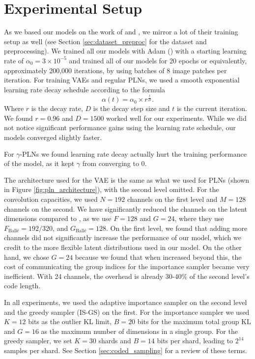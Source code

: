 \section{Experimental Setup}
\par
As we based our models on the work of \cite{balle2016end} and
\cite{balle2018variational}, we mirror a lot of their training setup as well
(see Section \ref{sec:dataset_preproc} for the dataset and preprocessing). We
trained all our models with Adam (\cite{kingma2014adam}) with a starting
learning rate of $\alpha_0 =
3 \times 10^{-5}$ and trained all of our models for 20 epochs or equivalently,
approximately 200,000 iterations, by using batches of 8 image patches per
iteration. For training VAEs and regular PLNs, we used a smooth
exponential learning rate decay schedule according to the formula
\[
  \alpha(t) = \alpha_0 \times r^{\frac{t}{D}}.
\]
Where $r$ is the decay rate, $D$ is the decay step size and $t$ is the current
iteration. We found $r = 0.96$ and $D = 1500$ worked well for our
experiments. While we did not notice significant performance gains using the
learning rate schedule, our models converged slightly faster.
\par
For $\gamma$-PLNs we found learning rate decay actually hurt the training
performance of the model, as it kept $\gamma$ from converging to 0.
\par
The architecture used for the VAE is the same as what we used for PLNs (shown in
Figure \ref{fig:pln_architecture}), with the second level omitted. For the
convolution capacities, we used $N = 192$ channels on the first
level and $M = 128$ channels on the second. We have significantly reduced the
channels on the latent dimensions compared to \cite{balle2018variational}, as we
use $F = 128$ and $G = 24$, where they use $F_{\text{Ball\'e}} = 192 / 320$, and
$G_{\text{Ball\'e}} = 128$. On the first level, we found that adding more
channels did not significantly increase the performance of our model, which we
credit to the more flexible latent distributions used in our model. On the other
hand, we chose $G = 24$ because we found that when increased beyond this, the
cost of communicating the group indices for the importance sampler became very
inefficient. With 24 channels, the overhead is already 30-40\% of the second
level's code length.
\par
In all experiments, we used the adaptive importance sampler on the second level and the
greedy sampler (IS-GS) on the first. For the importance sampler we used $K = 12$
bits as the outlier KL limit, $B = 20$ bits for the maximum total group KL and
$G = 16$ as the maximum number of dimensions in a single group. For the greedy
sampler, we set $K = 30$ shards and $B = 14$ bits per shard, leading to $2^{14}$
samples per shard. See Section \ref{sec:coded_sampling} for a review of these terms.

